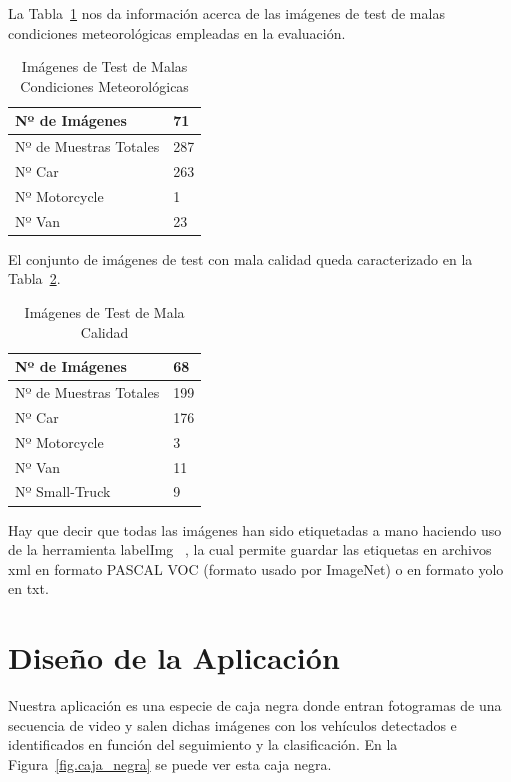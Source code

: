 La Tabla~\ref{tab_img_test_malas_condiciones} nos da información acerca de las imágenes de test de malas condiciones meteorológicas empleadas en la evaluación.
\begin{table}[H] 
\begin{center}
\begin{tabular}{|l|l|}
\hline
Nº de Imágenes  & 71 \\
\hline \hline
Nº de Muestras Totales & 287\\ \hline
Nº Car & 263 \\ \hline
Nº Motorcycle & 1 \\ \hline
Nº Van & 23 \\ \hline
\end{tabular}
\caption{Imágenes de Test de Malas Condiciones Meteorológicas}
\label{tab_img_test_malas_condiciones}
\end{center}
\end{table}

El conjunto de imágenes de test con mala calidad queda caracterizado en la Tabla~\ref{tab_img_test_mala_calidad}.

\begin{table}[H] 
\begin{center}
\begin{tabular}{|l|l|}
\hline
Nº de Imágenes  & 68 \\
\hline \hline
Nº de Muestras Totales & 199\\ \hline
Nº Car & 176 \\ \hline
Nº Motorcycle & 3 \\ \hline
Nº Van & 11 \\ \hline
Nº Small-Truck & 9 \\ \hline
\end{tabular}
\caption{Imágenes de Test de Mala Calidad}
\label{tab_img_test_mala_calidad}
\end{center}
\end{table}


Hay que decir que todas las imágenes han sido etiquetadas a mano haciendo uso de la herramienta labelImg ~\cite{labelimg}, la cual permite guardar las etiquetas en archivos xml en formato PASCAL VOC (formato usado por ImageNet) o en formato \acrshort{yolo} en txt.

\section{Diseño de la Aplicación}

Nuestra aplicación es una especie de caja negra donde entran fotogramas de una secuencia de video y salen dichas imágenes con los vehículos detectados e identificados en función del seguimiento y la clasificación. En la Figura~\ref{fig.caja_negra} se puede ver esta caja negra.

